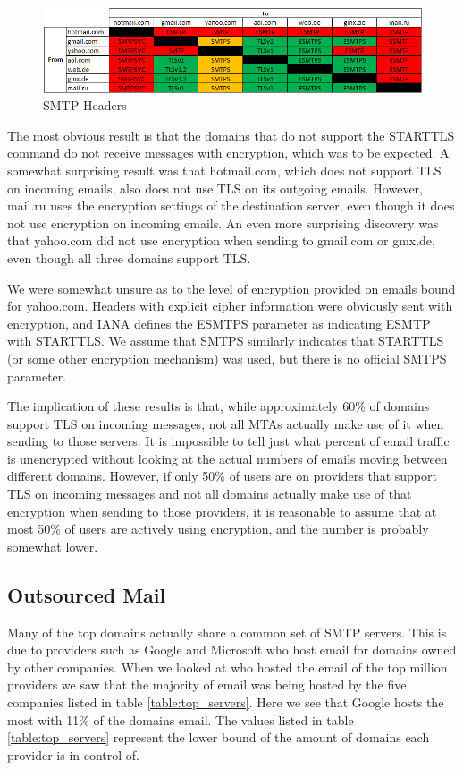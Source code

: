 \begin{figure}
    \includegraphics[width=6.0in]{images/email_analysis.png}
    \caption{SMTP Headers}
    \label{email_analysis}
\end{figure}

The most obvious result is that the domains that do not support the STARTTLS 
command do not receive messages with encryption, which was to be expected.  A 
somewhat surprising result was that hotmail.com, which does not support TLS on 
incoming emails, also does not use TLS on its outgoing emails.  However, mail.ru 
uses the encryption settings of the destination server, even though it does not 
use encryption on incoming emails.  An even more surprising discovery was that 
yahoo.com did not use encryption when sending to gmail.com or gmx.de, even 
though all three domains support TLS.

We were somewhat unsure as to the level of encryption provided on emails bound 
for yahoo.com.  Headers with explicit cipher information were obviously sent 
with encryption, and IANA defines the ESMTPS parameter as indicating ESMTP 
with STARTTLS\cite{mail}. We assume that SMTPS similarly indicates that STARTTLS (or some other 
encryption mechanism) was used, but there is no official SMTPS parameter.

The implication of these results is that, while approximately 60\% of domains 
support TLS on incoming messages, not all MTAs actually make use of it when 
sending to those servers.  It is impossible to tell just what percent of 
email traffic is unencrypted without looking at the actual numbers of emails 
moving between different domains.  However, if only 50\% of users are on 
providers that support TLS on incoming messages and not all domains actually 
make use of that encryption when sending to those providers, it is 
reasonable to assume that at most 50\% of users are actively using 
encryption, and the number is probably somewhat lower.

\subsection{Outsourced Mail}
Many of the top domains actually share a common set of SMTP servers. This is due 
to providers such as Google and Microsoft who host email for domains owned by 
other companies. When we looked at who hosted the email of the top million 
providers we saw that the majority of email was being hosted by the five 
companies listed in table \ref{table:top_servers}. Here we see that Google hosts 
the most with 11\% of the domains email. The values listed in table 
\ref{table:top_servers} represent the lower bound of the amount of domains each 
provider is in control of.

